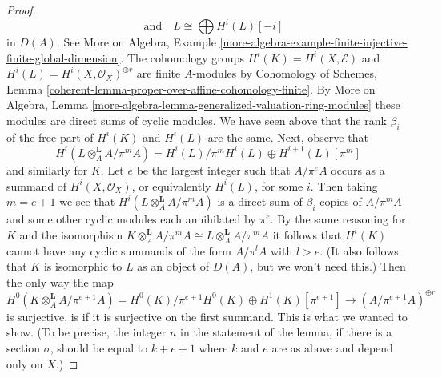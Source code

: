 \begin{proof}
$$\quad\text{and}\quad
L \cong
\bigoplus H^i(L)[-i]
$$
in $D(A)$. See More on Algebra, Example
\ref{more-algebra-example-finite-injective-finite-global-dimension}.
The cohomology groups $H^i(K) = H^i(X, \mathcal{E})$ and
$H^i(L) = H^i(X, \mathcal{O}_X)^{\oplus r}$
are finite $A$-modules by Cohomology of Schemes, Lemma
\ref{coherent-lemma-proper-over-affine-cohomology-finite}.
By More on Algebra, Lemma
\ref{more-algebra-lemma-generalized-valuation-ring-modules}
these modules are direct sums of cyclic modules.
We have seen above that the rank $\beta_i$ of the
free part of $H^i(K)$ and $H^i(L)$ are the same.
Next, observe that
$$
H^i(L \otimes_A^\mathbf{L} A/\pi^m A) =
H^i(L)/\pi^m H^i(L) \oplus H^{i + 1}(L)[\pi^m]
$$
and similarly for $K$. Let $e$ be the largest integer
such that $A/\pi^eA$ occurs as a summand of $H^i(X, \mathcal{O}_X)$,
or equivalently $H^i(L)$, for some $i$. Then taking $m = e + 1$
we see that $H^i(L \otimes_A^\mathbf{L} A/\pi^m A)$ is a direct sum of
$\beta_i$ copies of $A/\pi^m A$ and some other cyclic modules
each annihilated by $\pi^e$. By the same reasoning for $K$
and the isomorphism
$K \otimes_A^\mathbf{L} A/\pi^m A \cong L \otimes_A^\mathbf{L} A/\pi^m A$
it follows that $H^i(K)$
cannot have any cyclic summands of the form $A/\pi^l A$
with $l > e$. (It also follows that $K$ is isomorphic to $L$
as an object of $D(A)$, but we won't need this.)
Then the only way the map
$$
H^0(K \otimes^\mathbf{L}_A A/\pi^{e + 1} A) =
H^0(K)/\pi^{e + 1}H^0(K) \oplus H^1(K)[\pi^{e + 1}]
\longrightarrow
(A/\pi^{e + 1} A)^{\oplus r}
$$
is surjective, is if it is surjective on the
first summand. This is what we wanted to show.
(To be precise, the integer $n$ in the statement of
the lemma, if there is a section $\sigma$,
should be equal to $k + e + 1$ where $k$ and $e$ are as above
and depend only on $X$.)
\end{proof}